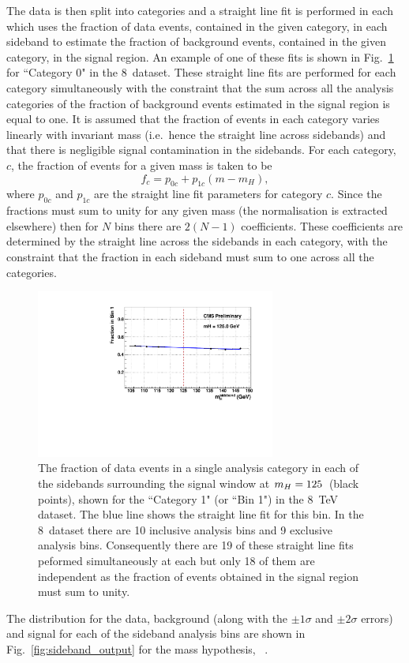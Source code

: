 The data is then split into categories and a straight line fit is performed in each which uses the fraction of data events, contained in the given category, in each sideband to estimate the fraction of background events, contained in the given category, in the signal region. An example of one of these fits is shown in Fig.~\ref{fig:sideband_shape} for ``Category 0" in the 8~\TeV dataset. These straight line fits are performed for each category simultaneously with the constraint that the sum across all the analysis categories of the fraction of background events estimated in the signal region is equal to one. It is assumed that the fraction of events in each category varies linearly with invariant mass (i.e.~hence the straight line across sidebands) and that there is negligible signal contamination in the sidebands. For each category, $c$, the fraction of events for a given mass is taken to be
\begin{equation}
  f_{c} = p_{0c} + p_{1c}(m-m_{H}),
\end{equation}
where $p_{0c}$ and $p_{1c}$ are the straight line fit parameters for category $c$. Since the fractions must sum to unity for any given mass (the normalisation is extracted elsewhere) then for $N$ bins there are $2(N-1)$ coefficients. These coefficients are determined by the straight line across the sidebands in each category, with the constraint that the fraction in each sideband must sum to one across all the categories. 
\begin{figure}
  \begin{center}
    \includegraphics[width=0.7\textwidth]{analysis/plots/sideband/sideband_fit.pdf}
    \caption[An example of one of the sideband fits for the \acs{SMVA}]{The fraction of data events in a single analysis category in each of the sidebands surrounding the signal window at $m_{H}=125$~\GeV (black points), shown for the \SMVA ``Category 1" (or ``Bin 1") in the 8~TeV dataset. The blue line shows the straight line fit for this bin. In the 8~\TeV dataset there are 10 inclusive analysis bins and 9 exclusive analysis bins. Consequently there are 19 of these straight line fits peformed simultaneously at each \mH but only 18 of them are independent as the fraction of events obtained in the signal region must sum to unity.}
    \label{fig:sideband_shape}
  \end{center}
\end{figure}
The distribution for the data, background (along with the $\pm1\sigma$ and $\pm2\sigma$ errors) and signal for each of the sideband analysis bins are shown in Fig.~\ref{fig:sideband_output} for the mass hypothesis, ~\GeV.

